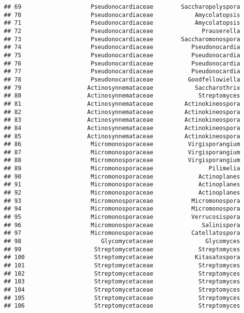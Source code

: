 \documentclass[
]{article}
\begin{document}
\begin{verbatim}
## 69                    Pseudonocardiaceae        Saccharopolyspora
## 70                    Pseudonocardiaceae            Amycolatopsis
## 71                    Pseudonocardiaceae            Amycolatopsis
## 72                    Pseudonocardiaceae              Prauserella
## 73                    Pseudonocardiaceae        Saccharomonospora
## 74                    Pseudonocardiaceae           Pseudonocardia
## 75                    Pseudonocardiaceae           Pseudonocardia
## 76                    Pseudonocardiaceae           Pseudonocardia
## 77                    Pseudonocardiaceae           Pseudonocardia
## 78                    Pseudonocardiaceae          Goodfellowiella
## 79                   Actinosynnemataceae            Saccharothrix
## 80                   Actinosynnemataceae             Streptomyces
## 81                   Actinosynnemataceae         Actinokineospora
## 82                   Actinosynnemataceae         Actinokineospora
## 83                   Actinosynnemataceae         Actinokineospora
## 84                   Actinosynnemataceae         Actinokineospora
## 85                   Actinosynnemataceae         Actinokineospora
## 86                    Micromonosporaceae          Virgisporangium
## 87                    Micromonosporaceae          Virgisporangium
## 88                    Micromonosporaceae          Virgisporangium
## 89                    Micromonosporaceae                Pilimelia
## 90                    Micromonosporaceae             Actinoplanes
## 91                    Micromonosporaceae             Actinoplanes
## 92                    Micromonosporaceae             Actinoplanes
## 93                    Micromonosporaceae           Micromonospora
## 94                    Micromonosporaceae           Micromonospora
## 95                    Micromonosporaceae           Verrucosispora
## 96                    Micromonosporaceae              Salinispora
## 97                    Micromonosporaceae           Catellatospora
## 98                       Glycomycetaceae               Glycomyces
## 99                     Streptomycetaceae             Streptomyces
## 100                    Streptomycetaceae            Kitasatospora
## 101                    Streptomycetaceae             Streptomyces
## 102                    Streptomycetaceae             Streptomyces
## 103                    Streptomycetaceae             Streptomyces
## 104                    Streptomycetaceae             Streptomyces
## 105                    Streptomycetaceae             Streptomyces
## 106                    Streptomycetaceae             Streptomyces

\end{verbatim}
\end{document}
